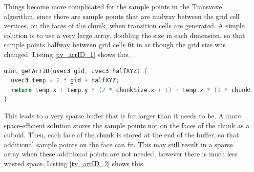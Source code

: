 \documentclass[11pt]{article}
\begin{document}
Things become more complicated for the sample points in the Transvoxel algorithm, since there are sample points that are midway between the grid cell vertices, on the faces of the chunk, when transition cells are generated. A simple solution is to use a very large array, doubling the size in each dimension, so that sample points halfway between grid cells fit in as though the grid size was changed. Listing \ref{tv_arrID_1} shows this.

\begin{lstlisting}[language=C++,label={tv_arrID_1},caption={Inefficient function mapping grid position \texttt{gid} and information about whether the sample point is in between the grid positions, \texttt{halfXYZ}, to a flat array id}]
uint getArrID(uvec3 gid, uvec3 halfXYZ) {
  uvec3 temp = 2 * gid + halfXYZ;
  return temp.x + temp.y * (2 * chunkSize.x + 1) + temp.z * (2 * chunkSize.x + 1) * (2 * chunkSize.y + 1);
}
\end{lstlisting}

This leads to a very sparse buffer that is far larger than it needs to be. A more space-efficient solution stores the sample points not on the faces of the chunk as a cuboid. Then, each face of the chunk is stored at the end of the buffer, so that additional sample points on the face can fit. This may still result in a sparse array when these additional points are not needed, however there is much less wasted space. Listing \ref{tv_arrID_2} shows this.
\end{document}
